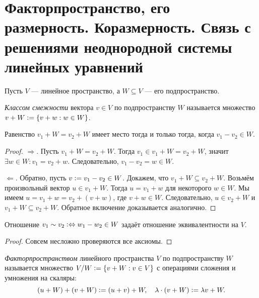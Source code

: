 \section{Факторпространство, его размерность. Коразмерность. Связь с решениями неоднородной системы линейных уравнений}

Пусть $V$ --- линейное пространство, а $W \subseteq V$ --- его подпространство.

\begin{definition}
    \textit{Классом смежности} вектора $v \in V$ по подпространству $W$ называется множество $v + W \vcentcolon = \{v + w : w \in W\}$.
\end{definition}

\begin{lemma}
    Равенство $v_1 + W = v_2 + W$ имеет место тогда и только тогда, когда $v_1 - v_2 \in W$.
\end{lemma}

\begin{proof}
    $\Rightarrow$. Пусть $v_1 + W = v_2 + W$. Тогда $v_1 \in v_1 + W = v_2 + W$, значит $\exists w \in W: v_1 = v_2 + w$. Следовательно, $v_1 - v_2 = w \in W$.

    $\Leftarrow$. Обратно, пусть $v \vcentcolon = v_1 - v_2 \in W$. Докажем, что $v_1 + W \subseteq v_2 + W$. Возьмём произвольный вектор $u \in v_1 + W$. Тогда $u = v_1 + w$ для некоторого $w \in W$. Мы имеем $u = v_1 + w = v_2 + (v + w)$, где $v + w \in W$. Следовательно, $u \in v_2 + W$ и $v_1 + W \subseteq v_2 + W$. Обратное включение доказывается аналогично.
\end{proof}

\begin{proposal}
    Отношение $v_1 \sim v_2 \vcentcolon\Leftrightarrow w_1 - w_2 \in W$ задаёт отношение эквивалентности на $V$.
\end{proposal}

\begin{proof}
    Совсем несложно проверяются все аксиомы.
\end{proof}

\begin{definition}
    \textit{Факторпространством} линейного пространства $V$ по подпространству $W$ называется множество $V / W \vcentcolon = \{v + W : v \in V\}$ с операциями сложения и умножения на скаляры:
    \[
        (u + W) + (v + W) \vcentcolon = (u + v) + W,\quad \lambda \cdot (v + W) \vcentcolon = \lambda v + W.
    \]
\end{definition}

